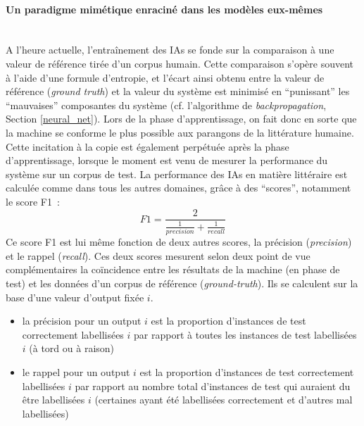\documentclass{article}
\newcommand{\subsubsubsection}[1]{\paragraph{#1}\mbox{}\\}
\begin{document}
				\subsubsubsection{Un paradigme mimétique enraciné dans les modèles eux-mêmes}
					
					A l'heure actuelle, l'entraînement des IAs se fonde sur la comparaison à une valeur de référence tirée d'un corpus humain. Cette comparaison s'opère souvent à l'aide d'une formule d'entropie, et l'écart ainsi obtenu entre la valeur de référence (\textit{ground truth}) et la valeur du système est minimisé en ``punissant'' les ``mauvaises'' composantes du système (cf. l'algorithme de \textit{backpropagation}, Section \ref{neural_net}). Lors de la phase d'apprentissage, on fait donc en sorte que la machine se conforme le plus possible aux parangons de la littérature humaine.\\
				
					Cette incitation à la copie est également perpétuée après la phase d'apprentissage, lorsque le moment est venu de mesurer la performance du système sur un corpus de test. La performance des IAs en matière littéraire est calculée comme dans tous les autres domaines, grâce à des ``scores'', notamment le score F1~:
					\begin{equation}
						F1 = \frac{2}{\frac{1}{precision}+\frac{1}{recall}}
					\end{equation}
					Ce score F1 est lui même fonction de deux autres scores, la précision (\textit{precision}) et le rappel (\textit{recall}). Ces deux scores mesurent selon deux point de vue complémentaires la coïncidence entre les résultats de la machine (en phase de test) et les données d'un corpus de référence (\textit{ground-truth}). Ils se calculent sur la base d'une valeur d'output fixée $i$. 
					\begin{itemize}
						\item la précision pour un output $i$ est la proportion d'instances de test correctement labellisées $i$ par rapport à toutes les instances de test labellisées $i$ (à tord ou à raison)
						\item le rappel pour un output $i$ est la proportion d'instances de test correctement labellisées $i$ par rapport au nombre total d'instances de test qui auraient du être labellisées $i$ (certaines ayant été labellisées correctement et d'autres mal labellisées)
					\end{itemize}
\end{document}

